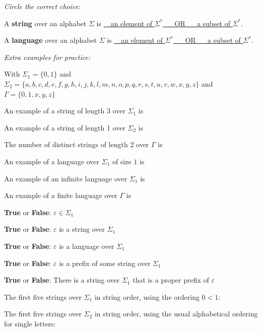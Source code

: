 \documentclass[12pt, oneside]{article}
\begin{document}
    

{\it Circle the correct choice}:

A {\bf string} over an alphabet $\Sigma$ is \underline{~~an element of $\Sigma^*$ ~~ OR ~~ a subset of $\Sigma^*$}.
    
A {\bf language} over an alphabet $\Sigma$ is \underline{~~an element of $\Sigma^*$ ~~ OR ~~ a subset of $\Sigma^*$}.


{\it Extra examples for practice:}

With $\Sigma_1 = \{0,1\}$ and $\Sigma_2 = \{a,b,c,d,e,f,g,h,i,j,k,l,m,n,o,p,q,r,s,t,u,v,w,x,y,z\}$  and $\Gamma = \{0,1,x,y,z\}$

An example of a string of length 3 over $\Sigma_1$ is \underline{\phantom{ $000$} \hspace{0.2in}}

An example of  a string of length 1 over $\Sigma_2$ is  \underline{\phantom{ $k$} \hspace{0.2in}}

The number of distinct strings of length 2 over $\Gamma$ is  \underline{\phantom{ $25$} \hspace{0.2in}}

An example of a language over $\Sigma_1$ of size $1$ is  \underline{\phantom{ $ \{ \varepsilon \} $} \hspace{0.2in}}

An example of an infinite language over $\Sigma_1$ is  \underline{\phantom{ $\Sigma^*$} \hspace{0.2in}}
    
An example of  a finite language over $\Gamma$ is  \underline{ \hspace{0.2in}}
    
{\bf True} or {\bf False}: $\varepsilon \in \Sigma_1$

{\bf True} or {\bf False}: $\varepsilon$ is  a string over $\Sigma_1$

{\bf True} or {\bf False}: $\varepsilon$ is a language over $\Sigma_1$

{\bf True} or {\bf False}: $\varepsilon$ is a prefix of some string over  $\Sigma_1$

{\bf True} or {\bf False}: There is a string over $\Sigma_1$ that is a proper prefix of $\varepsilon$
    

The first five strings over $\Sigma_1$ in string order, using the ordering $0 <  1$: \vfill
    
The first five strings over $\Sigma_2$ in string order, using the usual alphabetical ordering for single letters: \vfill
 \vfill
\end{document}
